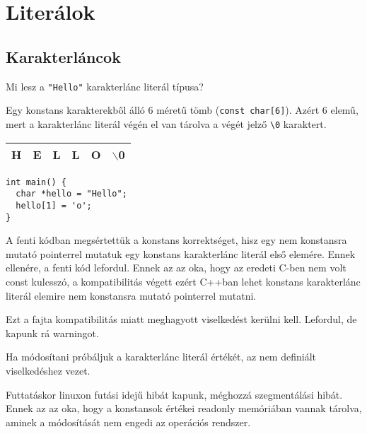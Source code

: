 \documentclass[../cpp_book/cpp_book.tex]{subfiles}
\begin{document}
	\section{Literálok}
	\subsection{Karakterláncok}
	Mi lesz a \texttt{"Hello"} karakterlánc literál típusa?
	\smallskip
	
	Egy konstans karakterekből álló 6 méretű tömb (\texttt{const char[6]}). Azért 6 elemű, mert a karakterlánc literál végén el van tárolva a végét jelző \texttt{\textbackslash 0} karaktert.
	
	\begin{center}
		\setlength{\extrarowheight}{2pt}
		\begin{tabular}{|c|c|c|c|c|c|}
			\hline
			H&E&L&L&O&$\backslash$0\\
			\hline
		\end{tabular}
	\end{center}
	
	\vspace{-4mm}
	\begin{lstlisting}
int main() {
  char *hello = "Hello";
  hello[1] = 'o';
}
	\end{lstlisting}
	A fenti kódban megsértettük a konstans korrektséget, hisz egy nem konstansra mutató pointerrel mutatuk egy konstans karakterlánc literál első elemére. Ennek ellenére, a fenti kód lefordul. Ennek az az oka, hogy az eredeti C-ben nem volt const kulcsszó, a kompatibilitás végett ezért C++ban lehet konstans karakterlánc literál elemire nem konstansra mutató pointerrel mutatni.
	\begin{note}
		Ezt a fajta kompatibilitás miatt meghagyott viselkedést kerülni kell. Lefordul, de kapunk rá warningot.
	\end{note}
	Ha módosítani próbáljuk a karakterlánc literál értékét, az nem definiált viselkedéshez vezet. 
	
	Futtatáskor linuxon futási idejű hibát kapunk, méghozzá szegmentálási hibát. Ennek az az oka, hogy a konstansok értékei readonly memóriában vannak tárolva, aminek a módosítását nem engedi az operációs rendszer.
  \medskip
	
\end{document}
